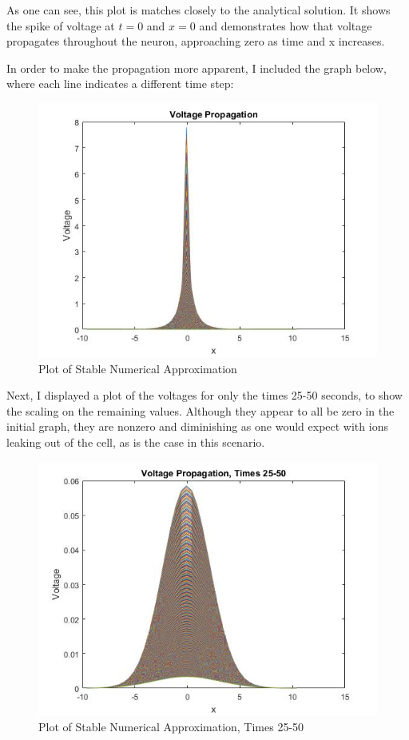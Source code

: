 \documentclass[12pt]{article}
\begin{document}
As one can see, this plot is matches closely to the analytical solution. It shows the spike of voltage at $t=0$ and $x=0$ and demonstrates how that voltage propagates throughout the neuron, approaching zero as time and x increases. \par
In order to make the propagation more apparent, I included the graph below, where each line indicates a different time step:
\begin{figure}[H]
  \includegraphics[width=\linewidth]{othergraph1.jpg}
  \caption{Plot of Stable Numerical Approximation}
  \label{fig:sketch2}
\end{figure}
Next, I displayed a plot of the voltages for only the times 25-50 seconds, to show the scaling on the remaining values. Although they appear to all be zero in the initial graph, they are nonzero and diminishing as one would expect with ions leaking out of the cell, as is the case in this scenario.
\begin{figure}[H]
  \includegraphics[width=\linewidth]{othergraph2.jpg}
  \caption{Plot of Stable Numerical Approximation, Times 25-50}
  \label{fig:sketch2}
\end{figure}
\end{document}
